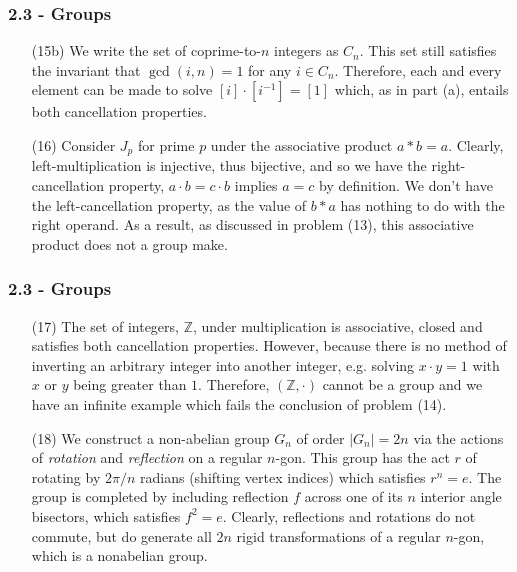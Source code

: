 \documentclass{beamer}
\begin{document}
\begin{frame}
\frametitle{2.3 - Groups}
\small
\begin{enumerate}
	\item[(15b)] We write the set of coprime-to-$n$ integers as $C_n$. This set still satisfies the invariant that $\gcd\left(i, n\right) = 1$ for any $i\in C_n$. Therefore, each and every element can be made to solve $[i]\cdot[i^{-1}]=[1]$ which, as in part (a), entails both cancellation properties.
	\item[(16)] Consider $J_p$ for prime $p$ under the associative product $a*b = a$. Clearly, left-multiplication is injective, thus bijective, and so we have the right-cancellation property, $a\cdot b = c\cdot b$ implies $a = c$ by definition. We don't have the left-cancellation property, as the value of $b*a$ has nothing to do with the right operand. As a result, as discussed in problem (13), this associative product does not a group make.
\end{enumerate}
\end{frame}
\begin{frame}
\frametitle{2.3 - Groups}
\small
\begin{enumerate}
	\item[(17)] The set of integers, $\mathbb Z$, under multiplication is associative, closed and satisfies both cancellation properties. However, because there is no method of inverting an arbitrary integer into another integer, e.g. solving $x\cdot y = 1$ with $x$ or $y$ being greater than $1$. Therefore, $(\mathbb Z, \cdot )$ cannot be a group and we have an infinite example which fails the conclusion of problem (14).
	\item[(18)] We construct a non-abelian group $G_n$ of order $|G_n| = 2n$ via the actions of \textit{rotation} and \textit{reflection} on a regular $n$-gon. This group has the act $r$ of rotating by $2\pi / n$ radians (shifting vertex indices) which satisfies $r^n = e$. The group is completed by including reflection $f$ across one of its $n$ interior angle bisectors, which satisfies $f^2 = e$. Clearly, reflections and rotations do not commute, but do generate all $2n$ rigid transformations of a regular $n$-gon, which is a nonabelian group.
\end{enumerate}
\end{frame}
\end{document}
